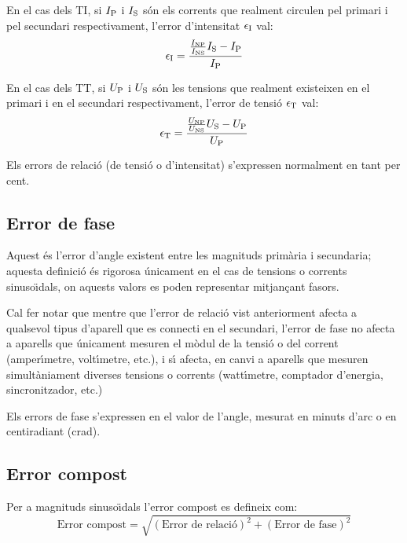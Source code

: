 En el cas dels TI, si $I_\mathrm{P}$ i $I_\mathrm{S}$ s\'{o}n els corrents que
realment circulen pel primari i pel secundari respectivament,
l'error d'intensitat $\epsilon_\mathrm{I}$ val:
\begin{equation}
    \epsilon_\mathrm{I} = \frac{\frac{I_\mathrm{NP}}{I_\mathrm{NS}} I_\mathrm{S} - I_\mathrm{P}} {I_\mathrm{P}}
\end{equation}

En el cas dels TT, si $U_\mathrm{P}$ i $U_\mathrm{S}$ s\'{o}n les tensions que
realment existeixen en el primari i en el secundari respectivament,
l'error de tensi\'{o} $\epsilon_\mathrm{T}$ val:
\begin{equation}
    \epsilon_\mathrm{T} = \frac{\frac{U_\mathrm{NP}}{U_\mathrm{NS}} U_\mathrm{S} - U_\mathrm{P}} {U_\mathrm{P}}
\end{equation}

Els errors de relaci\'{o} (de tensi\'{o} o d'intensitat) s'expressen
normalment en tant per cent.

\subsection{Error de fase}

Aquest \'{e}s l'error d'angle  existent entre les magnituds prim\`{a}ria i
secundaria; aquesta definici\'{o} \'{e}s rigorosa \'{u}nicament en el cas de
tensions o corrents sinuso\"{\i}dals, on aquests valors es poden
representar mitjan\c{c}ant fasors.

 Cal fer notar que mentre que l'error de relaci\'{o}
vist anteriorment afecta a qualsevol tipus d'aparell que es
connecti en el secundari, l'error de fase no afecta a aparells que
\'{u}nicament mesuren el m\`{o}dul de la tensi\'{o} o del corrent (amper\'{\i}metre,
volt\'{\i}metre, etc.), i s\'{\i} afecta, en canvi a aparells que mesuren
simult\`{a}niament diverses tensions o corrents (watt\'{\i}metre, comptador
d'energia, sincronitzador, etc.)

Els errors de fase s'expressen en el valor de l'angle, mesurat en
minuts d'arc o en centiradiant (crad).

\subsection{Error compost}

Per a magnituds sinuso\"{\i}dals l'error compost es defineix com:
\begin{equation}
    \text{Error compost} = \sqrt{(\text{Error de relaci\'{o}})^2 +
    (\text{Error de fase})^2}
\end{equation}

